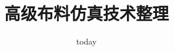 \documentclass{article}
\title{高级布料仿真技术整理}
\date{today}
\begin{document}
\maketitle
\tableofcontents

\section{}
\end{document}
